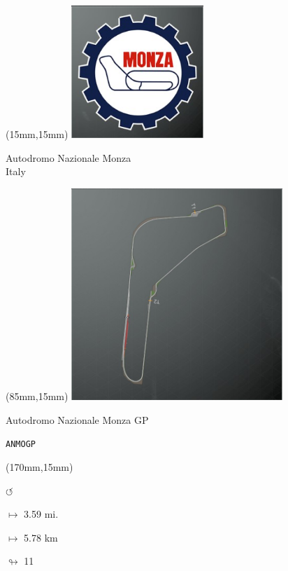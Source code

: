\null\newpage

\begin{textblock*}{60mm}(15mm,15mm)%
\includegraphics[width=50mm]{LG/2015-05-20_00086.png}
\par Autodromo Nazionale Monza\\ Italy
\end{textblock*}
\begin{textblock*}{80mm}(85mm,15mm)%
\includegraphics[width=80mm]{TR/2015-05-20_00034.png}
\centerline{Autodromo Nazionale Monza GP}
\par\hfill\tiny\tt ANMOGP\\
\end{textblock*}
\begin{textblock*}{30mm}(170mm,15mm)%
\par \Huge$\circlearrowleft$
\Large
\par$\mapsto$ 3.59 mi.
\par$\mapsto$ 5.78 km
\par$\looparrowright$ 11
\end{textblock*}
